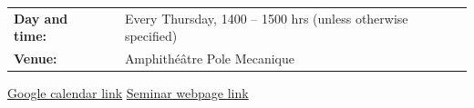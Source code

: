 \documentclass[a4paper,11pt,fleqn]{article}
\begin{document}
	\begin{center}
		\Large
		\begin{tabular}{p{4cm} p{15cm} }
			\raggedleft\textbf{Day and time:~} & Every Thursday, 1400 -- 1500 hrs (unless otherwise specified)\\ 
			\raggedleft\textbf{Venue:~} & Amphithéâtre Pole Mecanique\\
		\end{tabular}
		\vfill
		\textbullet \hspace*{0.5em} \href{https://calendar.google.com/calendar/embed?src=lms.seminaires%40gmail.com&ctz=Europe%2FZurich}{Google calendar link} \hspace*{0.5em} \textbullet \hspace*{0.5em} \href{https://polemecanique.github.io/lms-meca-seminars/}{Seminar webpage link} \hspace*{0.5em} \textbullet
	\end{center}
	
	
\end{document}
